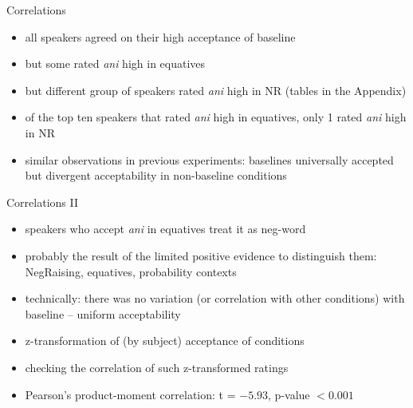 \documentclass[
  ignorenonframetext,
]{beamer}
\providecommand{\tightlist}{%
  \setlength{\itemsep}{0pt}\setlength{\parskip}{0pt}}\usepackage{longtable,booktabs,array}
\begin{document}
\begin{frame}
\begin{block}{Correlations}
\protect\hypertarget{correlations}{}
\begin{itemize}
\tightlist
\item
  all speakers agreed on their high acceptance of baseline
\item
  but some rated \emph{ani} high in equatives
\item
  but different group of speakers rated \emph{ani} high in NR (tables in
  the Appendix)
\item
  of the top ten speakers that rated \emph{ani} high in equatives, only
  1 rated \emph{ani} high in NR
\item
  similar observations in previous experiments: baselines universally
  accepted but divergent acceptability in non-baseline conditions
\end{itemize}
\end{block}
\end{frame}

\begin{frame}
\begin{block}{Correlations II}
\protect\hypertarget{correlations-ii}{}
\begin{itemize}
\tightlist
\item
  speakers who accept \emph{ani} in equatives treat it as neg-word
\item
  probably the result of the limited positive evidence to distinguish
  them: NegRaising, equatives, probability contexts
\item
  technically: there was no variation (or correlation with other
  conditions) with baseline -- uniform acceptability
\item
  z-transformation of (by subject) acceptance of conditions
\item
  checking the correlation of such z-transformed ratings
\item
  Pearson's product-moment correlation: t = \(-5.93\), p-value
  \(< 0.001\)
\end{itemize}
\end{block}
\end{frame}
\end{document}

